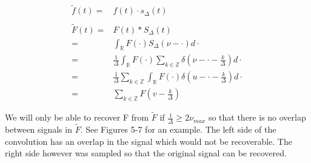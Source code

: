 \documentclass[11pt]{article}
\begin{document}
    \begin{equation*}
        \begin{split}
            \widetilde{f}(t) =& f(t)\cdot s_{\Delta}(t) \\ \\
            \widetilde{F}(t) =& F(t)*S_{\Delta}(t)\\
            =& \int_\mathbb{R} F(\cdot) S_{\Delta}(\nu-\cdot) d\cdot \\
            =& \frac{1}{\Delta} \int_\mathbb{R} F(\cdot) \sum_{k\in\mathbb{Z}} \delta(\nu-\cdot-\frac{k}{\Delta}) d\cdot \\
            =& \frac{1}{\Delta}\sum_{k\in\mathbb{Z}}\int_\mathbb{R}F(\cdot)\delta(u - \cdot-\frac{k}{\Delta})d\cdot \\
            =& \sum_{k\in\mathbb{Z}}F(v-\frac{k}{\Delta})
        \end{split}
    \end{equation*}

    We will only be able to recover F from $\widetilde{F}$ if $\frac{1}{\Delta} \geq 2\nu_{max}$ so that there is no overlap between signals in $\widetilde{F}$. See Figures 5-7 for an example. The left side of the convolution has an overlap in the signal which would not be recoverable. The right side however was sampled so that the original signal can be recovered.
\end{document}
